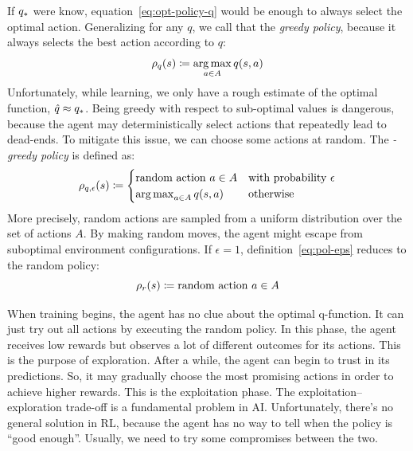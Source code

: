 If ${q}_*$ were know, equation~\eqref{eq:opt-policy-q} would be enough
to always select the optimal action. Generalizing for any $q$, we call that
the \emph{greedy policy}, because it always selects the best action according
to $q$:
\begin{equation}
	\rho_q(s) \coloneqq \operatorname*{arg\,max}_{a \in A} q(s, a)
	\label{eq:pol-greedy}
\end{equation}
Unfortunately, while learning, we only have a rough estimate of the optimal
function, ${\hat{q} \approx {q}_*}$. Being greedy with respect to
sub-optimal values is dangerous, because the agent may deterministically
select actions that repeatedly lead to dead-ends.  To mitigate this issue, we
can choose some actions at random. The \emph{\eps-greedy policy} is defined
as:
\begin{equation}
	\rho_{q,\epsilon}(s) \coloneqq
	\begin{cases}
		\text{random action $a \in A$}
		&\text{with probability $\epsilon$} \\
		\operatorname*{arg\,max}_{a \in A} q(s, a)
		&\text{otherwise}
	\end{cases}
	\label{eq:pol-eps}
\end{equation}
More precisely, random actions are sampled from a uniform distribution over
the set of actions $A$. By making random moves, the agent might escape from
suboptimal environment configurations. If $\epsilon = 1$,
definition~\eqref{eq:pol-eps} reduces to the random policy:
\begin{equation}
	\rho_r(s) \coloneqq \text{random action $a \in A$}
	\label{eq:pol-random}
\end{equation}

When training begins, the agent has no clue about the optimal q-function. It
can just try out all actions by executing the random policy. In this phase,
the agent receives low rewards but observes a lot of different outcomes for
its actions. This is the purpose of exploration. After a while, the agent can
begin to trust in its predictions. So, it may gradually choose the most
promising actions in order to achieve higher rewards. This is the exploitation
phase.  The exploitation--exploration trade-off is a fundamental problem in
AI.  Unfortunately, there's no general solution in RL, because the agent has
no way to tell when the policy is ``good enough''. Usually, we need to try
some compromises between the two.

